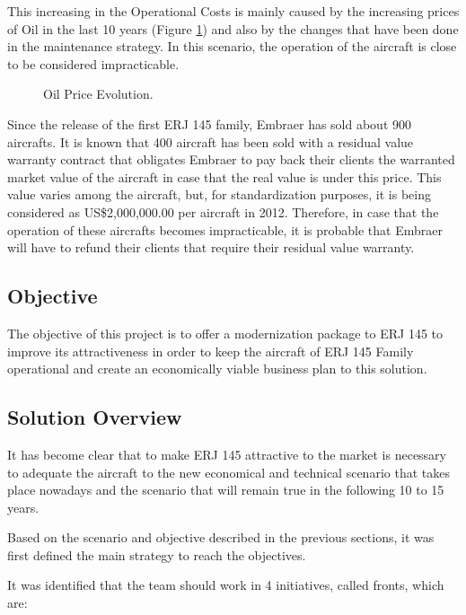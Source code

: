 This increasing in the Operational Costs is mainly caused by the increasing prices of Oil in the last 10 years (Figure \ref{fig:oilPriceEvolution}) and also by the changes that have been done in the maintenance strategy. In this scenario, the operation of the aircraft is close to be considered impracticable.

\begin{figure}[H] %
\caption{Oil Price Evolution.}
\label{fig:oilPriceEvolution}
\end{figure}

Since the release of the first ERJ 145 family, Embraer has sold about 900 aircrafts.
It is known that 400 aircraft has been sold with a residual value warranty contract that
obligates Embraer to pay back their clients the warranted market value of the aircraft in
case that the real value is under this price. This value varies among the aircraft, but, for standardization purposes, it is being considered as US\$2,000,000.00 per aircraft in 2012. Therefore, in case that the operation of these aircrafts becomes impracticable, it is probable that Embraer will have to refund their clients that require their residual value warranty.

\subsection{Objective}
The objective of this project is to offer a modernization package to ERJ 145 to improve its attractiveness in order to keep the aircraft of ERJ 145 Family operational and create an economically viable business plan to this solution.

\subsection{Solution Overview}
\label{sec:SolutionOverview}

It has become clear that to make ERJ 145 attractive to the market is necessary to adequate the aircraft to the new economical and technical scenario that takes place nowadays and the scenario that will remain true in the following 10 to 15 years.

Based on the scenario and objective described in the previous sections, it was first defined the main strategy to reach the objectives.

It was identified that the team should work in 4 initiatives, called fronts, which are:

